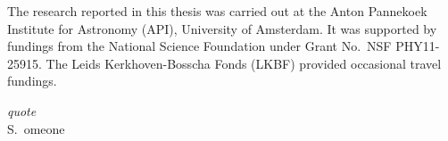 {\small The research reported in this thesis was carried out at the Anton
  Pannekoek Institute for Astronomy (API), University of Amsterdam. It was supported by fundings from the National Science
  Foundation under Grant No.~NSF PHY11-25915. The Leids Kerkhoven-Bosscha Fonds
  (LKBF) provided occasional travel fundings.} \vspace{0.5em}

\clearpage

\thispagestyle{empty}
\null\vfill\null
\hfill\parbox{110mm}{
  \raggedleft
    \emph{\large quote}\\[5pt]
  S.~omeone
}
\null\vfill\null
\clearpage
\thispagestyle{empty}
\newpage
\phantom{let's kill those trees}

\pagestyle{fancy}
\setlength\parindent{15pt}


